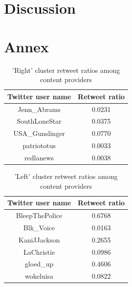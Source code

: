 \documentclass[12pt, authoryear]{elsarticle}
\begin{document}
\section{Discussion}
 
\pagebreak



\clearpage

\section{Annex}

\begin{center}
\begin{table}[H]
\begin{tabular}{ c c } 
Twitter user name & Retweet ratio \\
 \hline
Jenn\_Abrams	&	0.0231\\
SouthLoneStar	&	0.0375\\
USA\_Gunslinger&	0.0770\\
patriototus		&	0.0033\\
redlanews		&	0.0038\\
 \hline
\end{tabular}
\caption{'Right' cluster retweet ratios among content providers}
\label{table:1}
\end{table}
\end{center}

\begin{center}
\begin{table}[H]
\begin{tabular}{ c c } 
Twitter user name & Retweet ratio \\
 \hline
BleepThePolice &   0.6768 \\
Blk\_Voice       &  0.0163 \\
KaniJJackson   &   0.2655 \\
LaChristie  &      0.0986 \\
gloed\_up       &   0.4606 \\
wokeluisa     &    0.0822 \\
 \hline
\end{tabular}
\caption{'Left' cluster retweet ratios among content providers}
\label{table:2}
\end{table}
\end{center}
\end{document}
